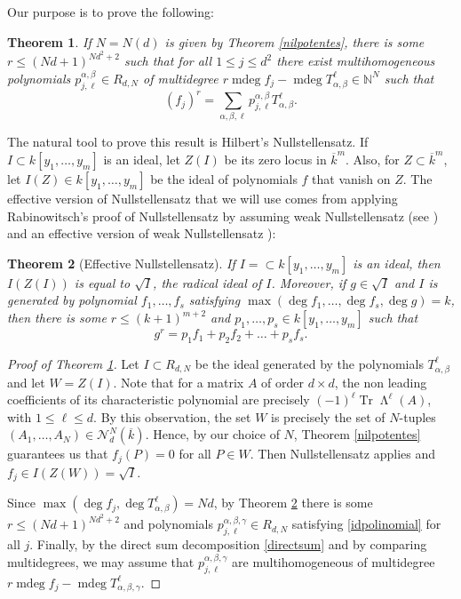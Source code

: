 \documentclass[JEP,XML,SOM,Unicode,NoEqCountersInSection]{cedram}
\let\mathcal\mathscr
\theoremstyle{plain}
\newtheorem{teo}{Theorem}[section]
\theoremstyle{definition}
\newcommand{\NN}{\mathbb{N}}
\DeclareMathOperator{\mdeg}{mdeg}
\DeclareMathOperator{\Tr}{Tr}
\DeclareMathOperator{\Wedge}{\mathsf{\Lambda}}
\begin{document}
Our purpose is to prove the following:
\begin{teo}\label{traduccion}
If $N\!=\!N(d)$ is given by Theorem \ref{nilpotentes}, there is some \hbox{$r\!\leq\!(Nd\!+\!1)^{Nd^2+2}$} such that for all $1\leq j\leq d^2$ there exist multihomogeneous polynomials $p^{\alpha,\beta}_{j,\ell} \in R_{d,N}$ of multidegree $r\mdeg{f_{j}}-\mdeg{T^{\ell}_{\alpha,\beta}}\in {\NN}^{N}$ such that
\begin{equation}\label{idpolinomial}
(f_{j})^{r}=\sum_{\alpha,\beta,\ell}{p^{\alpha,\beta}_{j,\ell}T^{\ell}_{\alpha,\beta}}.
\end{equation}
\end{teo}

The natural tool to prove this result is Hilbert's Nullstellensatz. If $I\subset k[y_1,\dots,y_m]$ is an ideal, let $Z(I)$ be its zero locus in ${\overline{k}}^m$. Also, for $Z\subset \overline{k}^m$, let $I(Z)\in k[y_1,\dots,y_m]$ be the ideal of polynomials $f$ that vanish on $Z$. The effective version of Nullstellensatz that we will use comes from applying Rabinowitsch's proof of Nullstellensatz by assuming weak Nullstellensatz (see \eg \cite[\S 1.7]{fulton}) and an effective version of weak Nullstellensatz \cite{som}):

\begin{teo}[Effective Nullstellensatz]\label{effnul} If $I=\subset k[y_1,\dots,y_m]$ is an ideal, then $I(Z(I))$ is equal to $\sqrt{I}$, the radical ideal of $I$. Moreover, if $g\in \sqrt{I}$ and $I$ is generated by polynomial $f_1,\dots,f_s$ satisfying $\max(\deg{f_1},\dots,\deg{f_s},\deg{g})=k$, then there is some $r\leq (k+1)^{m+2}$ and $p_1,\dots,p_s\in k[y_1,\dots,y_m]$ such that
\begin{equation*}
g^r=p_1f_1+p_2f_2+\dots+p_sf_s.
\end{equation*}
\end{teo}
\begin{proof}[Proof of Theorem \ref{traduccion}]
Let $I\subset R_{d,N}$ be the ideal generated by the polynomials $T_{\alpha,\beta}^{\ell}$ and let $W=Z(I)$.
Note that for a matrix $A$ of order $d\times d$, the non leading coefficients of its characteristic polynomial are precisely $(-1)^{\ell}\Tr{\Wedge^{\ell}(A)}$, with $1\leq \ell \leq d$. By this observation, the set $W$ is precisely the set of $N$-tuples $(A_1,\dots,A_N)\in \mathcal{N}_{d}^{N}(\overline{k})$. Hence, by our choice of $N$, Theorem \ref{nilpotentes} guarantees us that $f_{j}(P)=0$ for all $P\in W$. Then Nullstellensatz applies and $f_{j}\in I(Z(W))=\sqrt{I}$.

Since $\max(\deg{f_j},\deg{T_{\alpha,\beta}^{\ell}})=Nd$, by Theorem \ref{effnul} there is some $r\leq (Nd+1)^{Nd^2+2}$ and polynomials $p_{j,\ell}^{\alpha,\beta,\gamma}\in R_{d,N}$ satisfying \eqref{idpolinomial} for all $j$. Finally, by the direct sum decomposition \eqref{directsum} and by comparing multidegrees, we may assume that $p^{\alpha,\beta,\gamma}_{j,\ell}$ are multihomogeneous of multidegree $r\mdeg{f_{j}}-\mdeg{T^{\ell}_{\alpha,\beta,\gamma}}$.
\end{proof}
\end{document}
